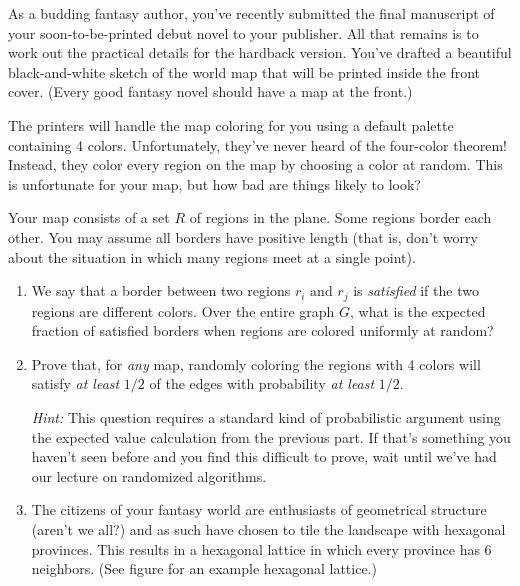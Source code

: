 \documentclass[12 pt, letterpaper]{hmcpset}
\begin{document}
\pagebreak

\begin{problem}
As a budding fantasy author, you've recently submitted the final manuscript of your soon-to-be-printed debut novel to your publisher. All that remains is to work out the practical details for the hardback version. You've drafted a beautiful black-and-white sketch of the world map that will be printed inside the front cover. (Every good fantasy novel should have a map at the front.) 

The printers will handle the map coloring for you using a default palette containing 4 colors. Unfortunately, they've never heard of the four-color theorem! Instead, they color every region on the map by choosing a color at random. This is unfortunate for your map, but how bad are things likely to look?

\vspace{0.5cm}

Your map consists of a set $R$ of regions in the plane. Some regions border each other. You may assume all borders have positive length (that is, don't worry about the situation in which many regions meet at a single point).

\begin{enumerate}
    \item We say that a border between two regions $r_i$ and $r_j$ is \emph{satisfied} if the two regions are different colors. Over the entire graph $G$, what is the expected fraction of satisfied borders when regions are colored uniformly at random?
    
    \item  Prove that, for \emph{any} map, randomly coloring the regions with 4 colors will satisfy \emph{at least} $1/2$ of the edges with probability \emph{at least} $1/2$.

    \emph{Hint:} This question requires a standard kind of probabilistic argument using the expected value calculation from the previous part. If that's something you haven't seen before and you find this difficult to prove, wait until we've had our lecture on randomized algorithms.
    
    \item The citizens of your fantasy world are enthusiasts of geometrical structure (aren't we all?) and as such have chosen to tile the landscape with hexagonal provinces. This results in a hexagonal lattice in which every province has 6 neighbors. (See figure for an example hexagonal lattice.)
    

\end{enumerate}
\end{problem}
\end{document}
